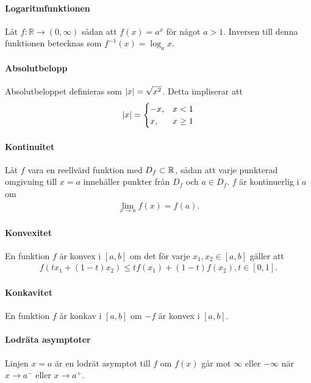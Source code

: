 \paragraph{Logaritmfunktionen}

Låt $f:\mathbb{R}\to (0,\infty)$ sådan att $f(x) = a^x$ för något $a > 1$. Inversen till denna funktionen betecknas som $f^{-1}(x) = \log_a x$.

\paragraph{Absolutbelopp}

Absolutbeloppet definieras som $\abs{x} = \sqrt{x^2}$. Detta impliserar att
\begin{align*}
	\abs{x} =
	\begin{cases}
		-x, & x < 1\\
		x,  & x \geq 1
	\end{cases}
\end{align*}
 
\paragraph{Kontinuitet}
Låt $f$ vara en reellvärd funktion med $D_f\subset\mathbb{R}$, sådan att varje punkterad omgivning till $x = a$ innehåller punkter från $D_f$ och $a\in D_f$. $f$ är kontinuerlig i $a$ om
\begin{align*}
	\lim\limits_{x\to a}f(x) = f(a).
\end{align*}

\paragraph{Konvexitet}
En funktion $f$ är konvex i $[a, b]$ om det för varje $x_1, x_2\in [a, b]$ gäller att
\begin{align*}
	f(tx_1 + (1 - t)x_2)\leq tf(x_1) + (1-t)f(x_2), t\in [0, 1].
\end{align*}

\paragraph{Konkavitet}
En funktion $f$ är konkav  i $[a, b]$ om $-f$ är konvex i $[a, b]$.

\paragraph{Lodräta asymptoter}
Linjen $x = a$ är en lodrät asymptot till $f$ om $f(x)$ går mot $\infty$ eller $-\infty$ när $x\to a^{-}$ eller $x\to a^{+}$.


